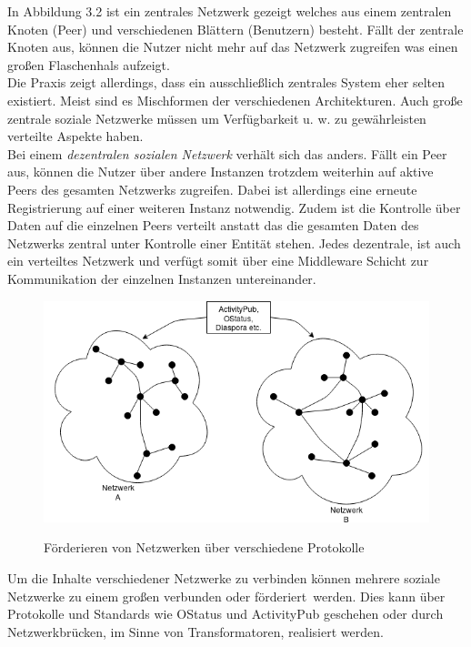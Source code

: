 	In Abbildung 3.2 ist ein zentrales Netzwerk gezeigt welches aus einem zentralen Knoten (Peer) und verschiedenen Blättern (Benutzern) besteht. Fällt der zentrale Knoten aus, können die Nutzer nicht mehr auf das Netzwerk zugreifen was einen großen Flaschenhals aufzeigt.\\
	
	Die Praxis zeigt allerdings, dass ein ausschließlich zentrales System eher selten existiert. Meist sind es Mischformen der verschiedenen Architekturen. Auch große zentrale soziale Netzwerke müssen um Verfügbarkeit u. w. zu gewährleisten verteilte Aspekte haben.\\
	
	Bei einem \textit{dezentralen sozialen Netzwerk} verhält sich das anders. Fällt ein Peer aus, können die Nutzer über andere Instanzen trotzdem weiterhin auf aktive Peers des gesamten Netzwerks zugreifen. Dabei ist allerdings eine erneute Registrierung auf einer weiteren Instanz notwendig. Zudem ist die Kontrolle über Daten auf die einzelnen Peers verteilt anstatt das die gesamten Daten des Netzwerks zentral unter Kontrolle einer Entität stehen. Jedes dezentrale, ist auch ein verteiltes Netzwerk und verfügt somit über eine Middleware Schicht zur Kommunikation der einzelnen Instanzen untereinander.\\
	\begin{figure}[h]
		\begin{minipage}{\textwidth}
			\centering
			\includegraphics[scale=0.5]{figures/federate.png}
			\label{fig:federated}
			\caption{Förderieren von Netzwerken über verschiedene Protokolle}
		\end{minipage}
	\end{figure}
	Um die Inhalte verschiedener Netzwerke zu verbinden können mehrere soziale Netzwerke zu einem großen verbunden oder \glqq förderiert\grqq~werden. Dies kann über Protokolle und Standards wie OStatus und ActivityPub geschehen oder durch Netzwerkbrücken, im Sinne von Transformatoren, realisiert werden.\\
	
